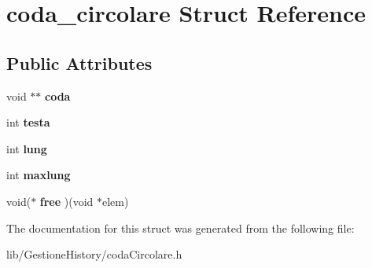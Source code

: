 \hypertarget{structcoda__circolare}{}\section{coda\+\_\+circolare Struct Reference}
\label{structcoda__circolare}
\subsection*{Public Attributes}
\begin{DoxyCompactItemize}
\item 
\mbox{\label{structcoda__circolare_aa81db96f014bb3ae692c57c29de43e1b}} 
void $\ast$$\ast$ {\bfseries coda}
\item 
\mbox{\label{structcoda__circolare_ac0ab8871b566b8b0f65579b8cf181cb4}} 
int {\bfseries testa}
\item 
\mbox{\label{structcoda__circolare_a082293865951415573e496707369d14c}} 
int {\bfseries lung}
\item 
\mbox{\label{structcoda__circolare_ab6e83ba24d75118ea3c63b70d5216f68}} 
int {\bfseries maxlung}
\item 
\mbox{\label{structcoda__circolare_a0c04371b90584a16e2f40315bcae7227}} 
void($\ast$ {\bfseries free} )(void $\ast$elem)
\end{DoxyCompactItemize}


The documentation for this struct was generated from the following file\+:\begin{DoxyCompactItemize}
\item 
lib/\+Gestione\+History/coda\+Circolare.\+h\end{DoxyCompactItemize}
